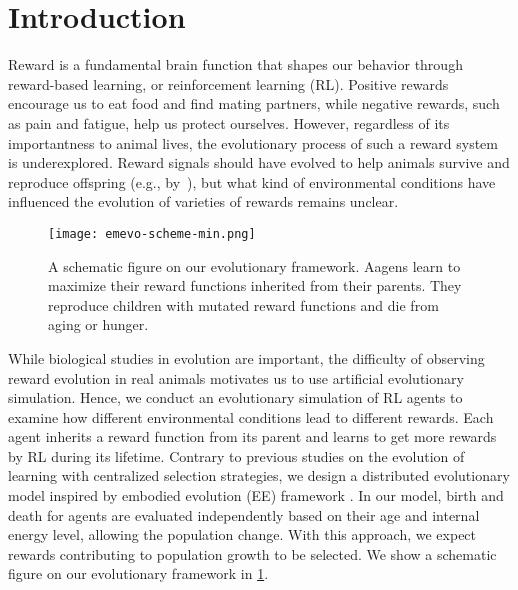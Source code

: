 \section{Introduction}\label{sec:intro}
Reward is a fundamental brain function that shapes our behavior through reward-based learning, or reinforcement learning (RL). Positive rewards encourage us to eat food and find mating partners, while negative rewards, such as pain and fatigue, help us protect ourselves. However, regardless of its importantness to animal lives, the evolutionary process of such a reward system is underexplored. Reward signals should have evolved to help animals survive and reproduce offspring (e.g., by~\cite{schultzNeuronalRewardDecision2015}), but what kind of environmental conditions have influenced the evolution of varieties of rewards remains unclear.

\begin{figure}[t]
  \centering{}
  \texttt{[image: emevo-scheme-min.png]}
  \caption{
    A schematic figure on our evolutionary framework.
    Aagens learn to maximize their reward functions inherited from their parents.
    They reproduce children with mutated reward functions and die from aging or hunger.
  }\label{figure:scheme}
\end{figure}

While biological studies in evolution are important, the difficulty of observing reward evolution in real animals motivates us to use artificial evolutionary simulation. Hence, we conduct an evolutionary simulation of RL agents to examine how different environmental conditions lead to different rewards. Each agent inherits a reward function from its parent and learns to get more rewards by RL during its lifetime. Contrary to previous studies on the evolution of learning \citep{hintonHowLearningCan1987,singhWhereRewardsCome2009} with centralized selection strategies, we design a distributed evolutionary model inspired by embodied evolution (EE) framework \citep{watsonEmbodiedEvolutionDistributing2002,bredecheEmbodiedEvolutionCollective2018}. In our model, birth and death for agents are evaluated independently based on their age and internal energy level, allowing the population change. With this approach, we expect rewards contributing to population growth to be selected. We show a schematic figure on our evolutionary framework in \cref{figure:scheme}.

